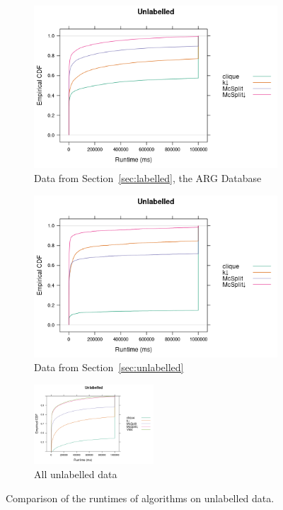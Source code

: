 \documentclass{l4proj}
\theoremstyle{definition}
\theoremstyle{remark}
\begin{document}
\begin{figure}
  \centering
  \begin{subfigure}[t]{0.49\textwidth}
    \centering
    \includegraphics[width=\textwidth]{images/ecdf_mcs.png}
    \caption{Data from Section~\ref{sec:labelled}, the ARG Database}
    \label{fig:ecdf_unlabelled_mcs}
  \end{subfigure}
  \begin{subfigure}[t]{0.49\textwidth}
    \centering
    \includegraphics[width=\textwidth]{images/ecdf_sip.png}
    \caption{Data from Section~\ref{sec:unlabelled}}
    \label{fig:ecdf_unlabelled_sip}
  \end{subfigure}
  \begin{subfigure}[t]{\textwidth}
    \centering
    \includegraphics[width=0.49\textwidth]{images/ecdf_unlabelled.png}
    \caption{All unlabelled data}
    \label{fig:ecdf_unlabelled_both}
  \end{subfigure}
  \caption{Comparison of the runtimes of algorithms on unlabelled data.}
  \label{fig:ecdf_unlabelled}
\end{figure}
\end{document}
